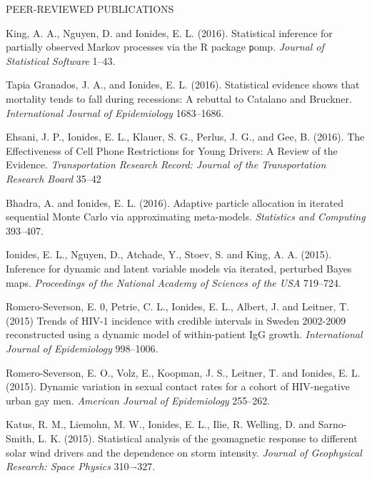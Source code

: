 \begin{reflist}{PEER-REVIEWED PUBLICATIONS}
\item King, A. A., Nguyen, D. and Ionides, E. L. (2016). Statistical inference for partially observed Markov processes via the R package {\texttt pomp}. {\em Journal of Statistical Software} {}{\separator}1--43.

\item  Tapia Granados, J. A.,  and Ionides, E. L. (2016). Statistical evidence shows that mortality tends to fall during recessions: A rebuttal to Catalano and Bruckner. {\em International Journal of Epidemiology} {}{\separator}1683--1686.

\item Ehsani, J. P.,  Ionides, E. L., Klauer, S. G., Perlus,  J. G., and Gee, B. (2016). The Effectiveness of Cell Phone Restrictions for Young Drivers: A Review of the Evidence. {\em Transportation Research Record: Journal of the Transportation Research Board} {}{\separator}35–42

\item
Bhadra, A. and Ionides, E. L. (2016). Adaptive particle allocation in iterated sequential Monte Carlo via approximating meta-models. {\em Statistics and Computing} {}{\separator}393--407.

\item Ionides, E. L., Nguyen, D., Atchade, Y., Stoev, S. and King, A. A. (2015). Inference for dynamic and latent variable models via iterated, perturbed Bayes maps.  {\em Proceedings of the National Academy of Sciences of the USA} {}{\separator}719--724.

\item Romero-Severson, E. 0, Petrie, C. L., Ionides, E. L., Albert, J. and Leitner, T. (2015) Trends of HIV-1 incidence with credible intervals in Sweden 2002-2009 reconstructed using a dynamic model of within-patient IgG growth. {\em International Journal of Epidemiology} {}{\separator}998--1006.


\item Romero-Severson, E. O., Volz, E., Koopman, J. S., Leitner, T. and Ionides, E. L. (2015). Dynamic variation in sexual contact rates for a cohort of HIV-negative urban gay men. {\em American Journal of Epidemiology}  {} 255--262.

\item
Katus, R. M., Liemohn,  M. W.,  Ionides, E. L., Ilie, R. Welling, D. and Sarno-Smith, L. K. (2015). Statistical analysis of the geomagnetic response to different solar wind drivers and the dependence on storm intensity. {\em Journal of Geophysical Research: Space Physics} {}{\separator}310–-327. 



\end{reflist}
